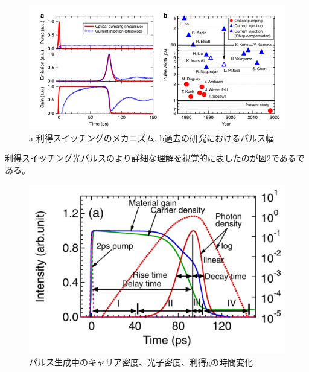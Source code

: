 \begin{figure}[h]
	\centering
	\includegraphics[width=15cm]{figure/fig_1_1_GS_ito.png}
	\caption{a 利得スイッチングのメカニズム, b過去の研究におけるパルス幅\cite{ref_t_ito}}
	\label{fig:fig_1_1_GS_ito}
\end{figure}

\newpage
利得スイッチング光パルスのより詳細な理解を視覚的に表したのが図\ref{fig:fig_1_1_GS_pulse}である\cite{ref_1_1_GS}である。
\begin{figure}[h]
	\centering
	\includegraphics[width=15cm]{figure/fig_1_1_GS_pulse.png}
	\caption{パルス生成中のキャリア密度、光子密度、利得gの時間変化\cite{ref_1_1_GS}}
	\label{fig:fig_1_1_GS_pulse}
\end{figure}

